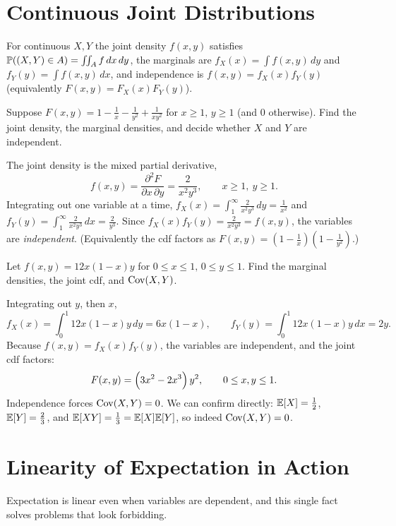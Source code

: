 \section{Continuous Joint Distributions}

For continuous $X,Y$ the joint density $f(x,y)$ satisfies
$\mathbb{P}((X,Y)\in A)=\iint_A f\,dx\,dy$, the marginals are
$f_X(x)=\int f(x,y)\,dy$ and $f_Y(y)=\int f(x,y)\,dx$, and independence is
$f(x,y)=f_X(x)f_Y(y)$ (equivalently $F(x,y)=F_X(x)F_Y(y)$).

\begin{example}
Suppose $F(x,y)=1-\tfrac1x-\tfrac1{y^2}+\tfrac1{xy^2}$ for $x\ge 1,\,y\ge 1$
(and $0$ otherwise). Find the joint density, the marginal densities, and decide
whether $X$ and $Y$ are independent.

\solution The joint density is the mixed partial derivative,
\[
  f(x,y)=\frac{\partial^2 F}{\partial x\,\partial y}=\frac{2}{x^2 y^3},\qquad x\ge 1,\ y\ge 1.
\]
Integrating out one variable at a time,
$f_X(x)=\int_1^\infty \tfrac{2}{x^2 y^3}\,dy=\tfrac1{x^2}$ and
$f_Y(y)=\int_1^\infty \tfrac{2}{x^2 y^3}\,dx=\tfrac{2}{y^3}$. Since
$f_X(x)f_Y(y)=\tfrac{2}{x^2 y^3}=f(x,y)$, the variables are \emph{independent}.
(Equivalently the cdf factors as $F(x,y)=(1-\tfrac1x)(1-\tfrac1{y^2})$.)
\end{example}

\begin{example}
Let $f(x,y)=12x(1-x)y$ for $0\le x\le 1,\,0\le y\le 1$. Find the marginal
densities, the joint cdf, and $\mathrm{Cov}(X,Y)$.

\solution Integrating out $y$, then $x$,
\[
  f_X(x)=\int_0^1 12x(1-x)y\,dy=6x(1-x),\qquad
  f_Y(y)=\int_0^1 12x(1-x)y\,dx=2y.
\]
Because $f(x,y)=f_X(x)f_Y(y)$, the variables are independent, and the joint cdf
factors:
\[
  F(x,y)=\Bigl(3x^2-2x^3\Bigr)\,y^2,\qquad 0\le x,y\le 1.
\]
Independence forces $\mathrm{Cov}(X,Y)=0$. We can confirm directly:
$\mathbb{E}[X]=\tfrac12$, $\mathbb{E}[Y]=\tfrac23$, and $\mathbb{E}[XY]=\tfrac13=\mathbb{E}[X]\mathbb{E}[Y]$, so indeed
$\mathrm{Cov}(X,Y)=0$.
\end{example}

\section{Linearity of Expectation in Action}

Expectation is linear even when variables are dependent, and this single fact
solves problems that look forbidding.

